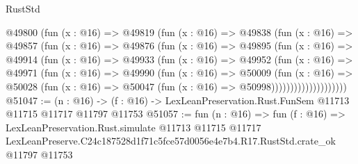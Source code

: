 \begin{lexlean}{RustStd}
\begin{coremodule}
              @49800
                (fun (x : @16) =>
                @49819
                  (fun (x : @16) =>
                  @49838
                    (fun (x : @16) =>
                    @49857
                      (fun (x : @16) =>
                      @49876
                        (fun (x : @16) =>
                        @49895
                          (fun (x : @16) =>
                          @49914
                            (fun (x : @16) =>
                            @49933
                              (fun (x : @16) =>
                              @49952
                                (fun (x : @16) =>
                                @49971
                                  (fun (x : @16) =>
                                  @49990
                                    (fun (x : @16) =>
                                    @50009
                                      (fun (x : @16) =>
                                      @50028
                                        (fun (x : @16) =>
                                        @50047 (fun (x : @16) => @50998))))))))))))))))))))
@51047 := (n : @16) ->
  (f : @16) -> LexLeanPreservation.Rust.FunSem @11713 @11715 @11717 @11797 @11753
@51057 := fun (n : @16) =>
  fun (f : @16) =>
  LexLeanPreservation.Rust.simulate
    @11713
    @11715
    @11717
    LexLeanPreserve.C24c187528d1f71c5fce57d0056e4e7b4.R17.RustStd.crate_ok
    @11797
    @11753
\end{coremodule}
\end{lexlean}
